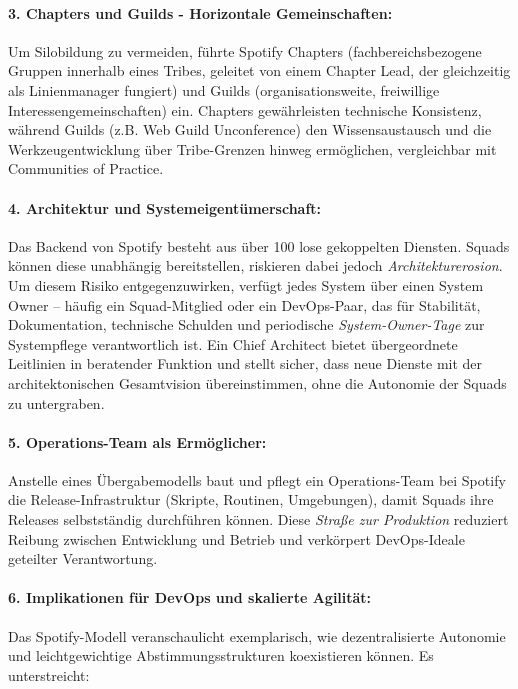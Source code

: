 \paragraph{3. Chapters und Guilds - Horizontale Gemeinschaften:}
Um Silobildung zu vermeiden, führte Spotify Chapters (fachbereichsbezogene Gruppen innerhalb eines Tribes,
geleitet von einem Chapter Lead, der gleichzeitig als Linienmanager fungiert) und Guilds
(organisationsweite, freiwillige Interessengemeinschaften) ein. Chapters gewährleisten technische Konsistenz, während Guilds
(z.B. Web Guild Unconference) den Wissensaustausch und die Werkzeugentwicklung über Tribe-Grenzen hinweg ermöglichen,
vergleichbar mit Communities of Practice.

\paragraph{4. Architektur und Systemeigentümerschaft:}
Das Backend von Spotify besteht aus über 100 lose gekoppelten Diensten. Squads können diese unabhängig bereitstellen,
riskieren dabei jedoch \textit{Architekturerosion}. Um diesem Risiko entgegenzuwirken, verfügt jedes System über einen System Owner –
häufig ein Squad-Mitglied oder ein DevOps-Paar, das für Stabilität, Dokumentation, technische Schulden und periodische
\textit{System-Owner-Tage}  zur Systempflege verantwortlich ist. Ein Chief Architect bietet übergeordnete Leitlinien in beratender Funktion
und stellt sicher, dass neue Dienste mit der architektonischen Gesamtvision übereinstimmen, ohne die Autonomie der Squads zu untergraben.

\paragraph{5. Operations-Team als Ermöglicher:}
Anstelle eines Übergabemodells baut und pflegt ein Operations-Team bei Spotify die Release-Infrastruktur
(Skripte, Routinen, Umgebungen), damit Squads ihre Releases selbstständig durchführen können.
Diese \textit{Straße zur Produktion} reduziert Reibung zwischen Entwicklung und Betrieb und verkörpert DevOps-Ideale geteilter Verantwortung.

\paragraph{6. Implikationen für DevOps und skalierte Agilität:} Das Spotify-Modell veranschaulicht exemplarisch,
wie dezentralisierte Autonomie und leichtgewichtige Abstimmungsstrukturen koexistieren können. Es unterstreicht:

